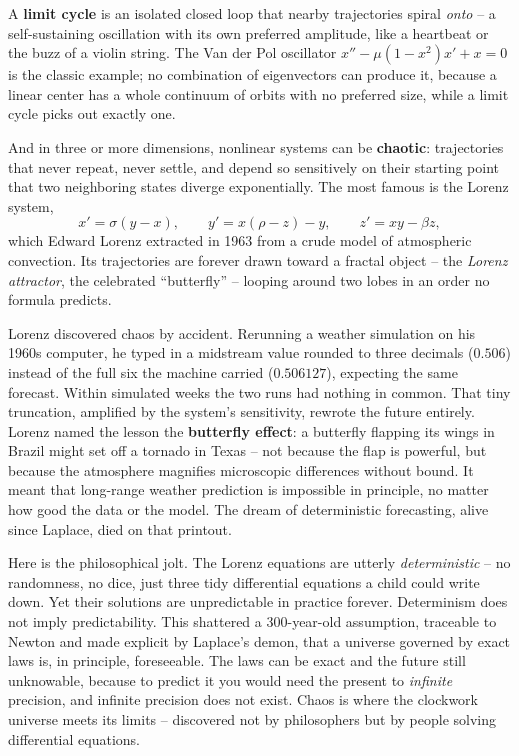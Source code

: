 A \textbf{limit cycle} is an isolated closed loop that nearby trajectories spiral
\emph{onto} -- a self-sustaining oscillation with its own preferred amplitude,
like a heartbeat or the buzz of a violin string. The Van der Pol oscillator
$x'' - \mu(1-x^2)x' + x = 0$ is the classic example; no combination of
eigenvectors can produce it, because a linear center has a whole continuum of
orbits with no preferred size, while a limit cycle picks out exactly one.

And in three or more dimensions, nonlinear systems can be \textbf{chaotic}:
trajectories that never repeat, never settle, and depend so sensitively on their
starting point that two neighboring states diverge exponentially. The most famous
is the Lorenz system,
\[
  x' = \sigma(y-x), \qquad y' = x(\rho - z) - y, \qquad z' = xy - \beta z,
\]
which Edward Lorenz extracted in 1963 from a crude model of atmospheric
convection. Its trajectories are forever drawn toward a fractal object -- the
\emph{Lorenz attractor}, the celebrated ``butterfly'' -- looping around two lobes
in an order no formula predicts.

\begin{historybox}
Lorenz discovered chaos by accident. Rerunning a weather simulation on his
1960s computer, he typed in a midstream value rounded to three decimals
($0.506$) instead of the full six the machine carried ($0.506127$), expecting the
same forecast. Within simulated weeks the two runs had nothing in common. That
tiny truncation, amplified by the system's sensitivity, rewrote the future
entirely. Lorenz named the lesson the \textbf{butterfly effect}: a butterfly
flapping its wings in Brazil might set off a tornado in Texas -- not because the
flap is powerful, but because the atmosphere magnifies microscopic differences
without bound. It meant that long-range weather prediction is impossible in
principle, no matter how good the data or the model. The dream of deterministic
forecasting, alive since Laplace, died on that printout.
\end{historybox}

\begin{aestheticbox}
Here is the philosophical jolt. The Lorenz equations are utterly
\emph{deterministic} -- no randomness, no dice, just three tidy differential
equations a child could write down. Yet their solutions are unpredictable in
practice forever. Determinism does not imply predictability. This shattered a
300-year-old assumption, traceable to Newton and made explicit by Laplace's
demon, that a universe governed by exact laws is, in principle, foreseeable. The
laws can be exact and the future still unknowable, because to predict it you would
need the present to \emph{infinite} precision, and infinite precision does not
exist. Chaos is where the clockwork universe meets its limits -- discovered not
by philosophers but by people solving differential equations.
\end{aestheticbox}

